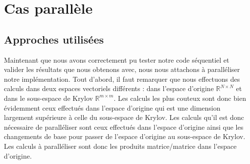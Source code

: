 \documentclass[11pt,a4paper]{article}
\begin{document}
\section{Cas parallèle}
	\subsection{Approches utilisées}
		Maintenant que nous avons correctement pu tester notre code séquentiel et valider les résultats que nous obtenons avec, nous nous attachons à paralléliser notre implémentation. Tout d'abord, il faut remarquer que nous effectuons des calculs dans deux espaces vectoriels différents : dans l'espace d'origine $\mathbb{R}^{N\times N}$ et dans le sous-espace de Krylov $\mathbb{R}^{m\times m}$. Les calculs les plus couteux sont donc bien évidemment ceux effectués dans l'espace d'origine qui est une dimension largement supérieure à celle du sous-espace de Krylov. Les calculs qu'il est donc nécessaire de paralléliser sont ceux effectués dans l'espace d'origine ainsi que les changements de base pour passer de l'espace d'origine au sous-espace de Krylov. Les calculs à paralléliser sont donc les produits matrice/matrice dans l'espace d'origine.
\end{document}
